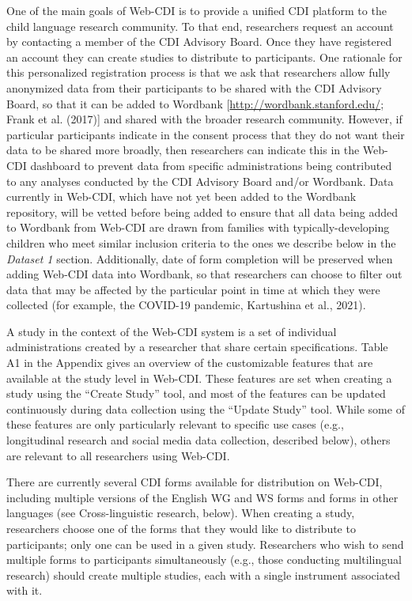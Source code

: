 \documentclass[
  english,
  ,man,floatsintext]{apa6}
\begin{document}
One of the main goals of Web-CDI is to provide a unified CDI platform to the child language research community. To that end, researchers request an account by contacting a member of the CDI Advisory Board. Once they have registered an account they can create studies to distribute to participants. One rationale for this personalized registration process is that we ask that researchers allow fully anonymized data from their participants to be shared with the CDI Advisory Board, so that it can be added to Wordbank {[}\url{http://wordbank.stanford.edu/}; Frank et al. (2017){]} and shared with the broader research community. However, if particular participants indicate in the consent process that they do not want their data to be shared more broadly, then researchers can indicate this in the Web-CDI dashboard to prevent data from specific administrations being contributed to any analyses conducted by the CDI Advisory Board and/or Wordbank. Data currently in Web-CDI, which have not yet been added to the Wordbank repository, will be vetted before being added to ensure that all data being added to Wordbank from Web-CDI are drawn from families with typically-developing children who meet similar inclusion criteria to the ones we describe below in the \emph{Dataset 1} section. Additionally, date of form completion will be preserved when adding Web-CDI data into Wordbank, so that researchers can choose to filter out data that may be affected by the particular point in time at which they were collected (for example, the COVID-19 pandemic, Kartushina et al., 2021).

A study in the context of the Web-CDI system is a set of individual administrations created by a researcher that share certain specifications. Table A1 in the Appendix gives an overview of the customizable features that are available at the study level in Web-CDI. These features are set when creating a study using the ``Create Study'' tool, and most of the features can be updated continuously during data collection using the ``Update Study'' tool. While some of these features are only particularly relevant to specific use cases (e.g., longitudinal research and social media data collection, described below), others are relevant to all researchers using Web-CDI.

There are currently several CDI forms available for distribution on Web-CDI, including multiple versions of the English WG and WS forms and forms in other languages (see Cross-linguistic research, below). When creating a study, researchers choose one of the forms that they would like to distribute to participants; only one can be used in a given study. Researchers who wish to send multiple forms to participants simultaneously (e.g., those conducting multilingual research) should create multiple studies, each with a single instrument associated with it.
\end{document}
